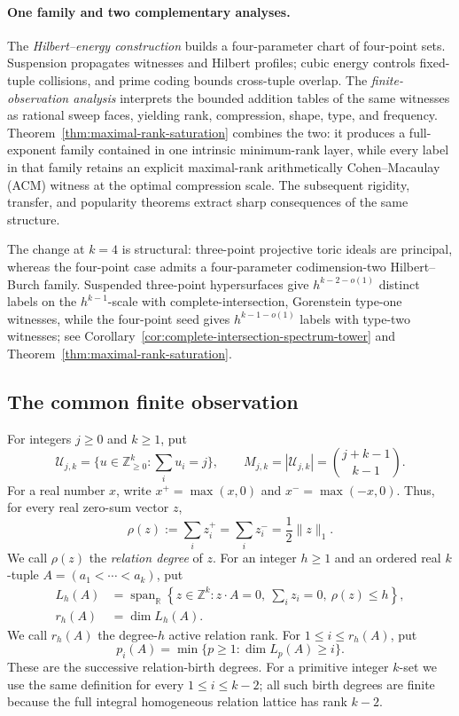 \documentclass[11pt,reqno]{amsart}
\theoremstyle{definition}
\theoremstyle{remark}
\begin{document}
\paragraph{One family and two complementary analyses.}
The \emph{Hilbert--energy construction} builds a four-parameter chart of
four-point sets.  Suspension propagates witnesses and Hilbert profiles;
cubic energy controls fixed-tuple collisions, and prime coding bounds
cross-tuple overlap.
The \emph{finite-observation analysis} interprets the bounded
addition tables of the same witnesses as rational sweep faces, yielding
rank, compression, shape, type, and frequency.
Theorem~\ref{thm:maximal-rank-saturation} combines the two: it produces a
full-exponent family contained in one intrinsic minimum-rank layer, while
every label in that family retains an explicit maximal-rank arithmetically
Cohen--Macaulay (ACM) witness at the optimal compression scale.  The
subsequent rigidity, transfer, and popularity theorems extract sharp
consequences of the same structure.

The change at $k=4$ is structural: three-point projective toric ideals are
principal, whereas the four-point case admits a four-parameter
codimension-two Hilbert--Burch family.  Suspended three-point hypersurfaces give
$h^{k-2-o(1)}$ distinct labels on the $h^{k-1}$-scale with
complete-intersection, Gorenstein
type-one witnesses, while the four-point seed gives $h^{k-1-o(1)}$ labels
with type-two witnesses; see
Corollary~\ref{cor:complete-intersection-spectrum-tower} and
Theorem~\ref{thm:maximal-rank-saturation}.

\subsection*{The common finite observation}

For integers $j\geq0$ and $k\geq1$, put
\[
 \mathcal U_{j,k}=\{u\in\mathbb Z_{\geq0}^k:\textstyle\sum_i u_i=j\},
 \qquad
 M_{j,k}=|\mathcal U_{j,k}|=\binom{j+k-1}{k-1}.
\]
For a real number $x$, write $x^+=\max(x,0)$ and
$x^-=\max(-x,0)$.  Thus, for every real zero-sum vector $z$,
\[
 \rho(z):=\sum_i z_i^+=\sum_i z_i^-=\frac12\lVert z\rVert_1.
\]
We call $\rho(z)$ the \emph{relation degree} of $z$.
For an integer $h\geq1$ and an ordered real $k$-tuple
$A=(a_1<\cdots<a_k)$, put
\[
 \begin{aligned}
 L_h(A)&=\operatorname{span}_{\mathbb R}
 \left\{z\in\mathbb Z^k:
 z\cdot A=0,\ \sum_i z_i=0,\ \rho(z)\leq h\right\},\\
 r_h(A)&=\dim L_h(A).
 \end{aligned}
\]
We call $r_h(A)$ the degree-$h$ active relation rank.  For
$1\leq i\leq r_h(A)$, put
\[
 p_i(A)=\min\{p\geq1:\dim L_p(A)\geq i\}.
\]
These are the successive relation-birth degrees.
For a primitive integer $k$-set we use the same definition for every
$1\leq i\leq k-2$; all such birth degrees are finite because the full
integral homogeneous relation lattice has rank $k-2$.
\end{document}
